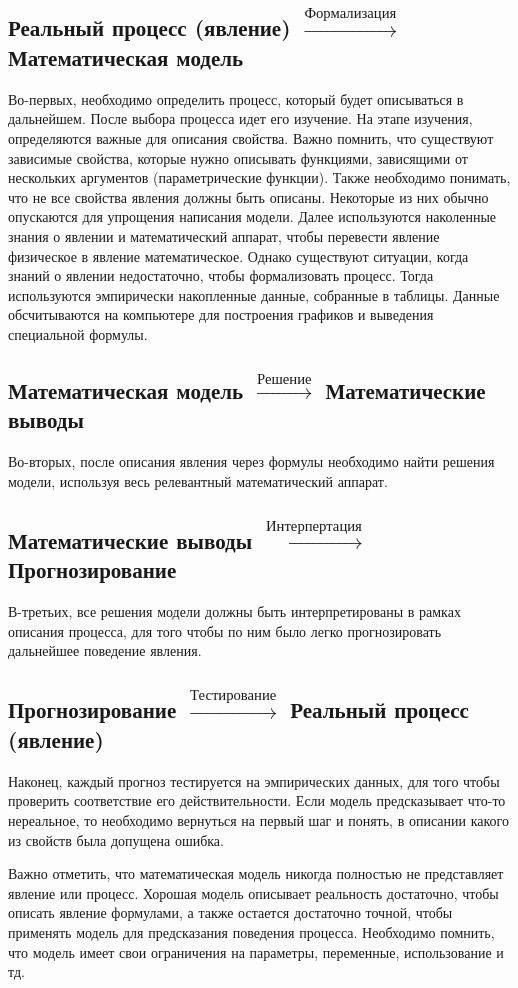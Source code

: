\documentclass[a4paper,14pt]{report}
\begin{document}
 
 
 \subsection*{Реальный процесс (явление) $\xrightarrow{\text{Формализация}}$ Математическая модель}
 
 Во-первых, необходимо определить процесс, который будет описываться в дальнейшем. После выбора процесса идет его изучение. На этапе изучения, определяются важные для описания свойства. Важно помнить, что существуют зависимые свойства, которые нужно описывать функциями, зависящими от нескольких аргументов (параметрические функции). Также необходимо понимать, что не все свойства явления должны быть описаны. Некоторые из них обычно опускаются для упрощения написания модели. Далее используются наколенные знания о явлении и математический аппарат, чтобы перевести явление физическое в явление математическое. Однако существуют ситуации, когда знаний о явлении недостаточно, чтобы формализовать процесс. Тогда используются эмпирически накопленные данные, собранные в таблицы. Данные обсчитываются на компьютере для построения графиков и выведения специальной формулы. \par
 
  \subsection*{Математическая модель $\xrightarrow{\text{Решение}}$ Математические выводы}

 
 Во-вторых, после описания явления через формулы необходимо найти решения модели, используя весь релевантный математический аппарат.
 
 \subsection*{Математические выводы $\xrightarrow{\text{Интерпертация}}$ Прогнозирование}
 В-третьих, все решения модели должны быть интерпретированы в рамках описания процесса, для того чтобы по ним было легко прогнозировать дальнейшее поведение явления.

\subsection*{Прогнозирование $\xrightarrow{\text{Тестирование}}$ Реальный процесс (явление)}
Наконец, каждый прогноз тестируется на эмпирических данных, для того чтобы проверить соответствие его действительности. Если модель предсказывает что-то нереальное, то необходимо вернуться на первый шаг и понять, в описании какого из свойств была допущена ошибка.\par
Важно отметить, что математическая модель никогда полностью не представляет явление или процесс. Хорошая модель описывает реальность достаточно, чтобы описать явление формулами, а также остается достаточно точной, чтобы применять модель для предсказания поведения процесса. Необходимо помнить, что модель имеет свои ограничения на параметры, переменные, использование и тд. \par
 
\end{document}
